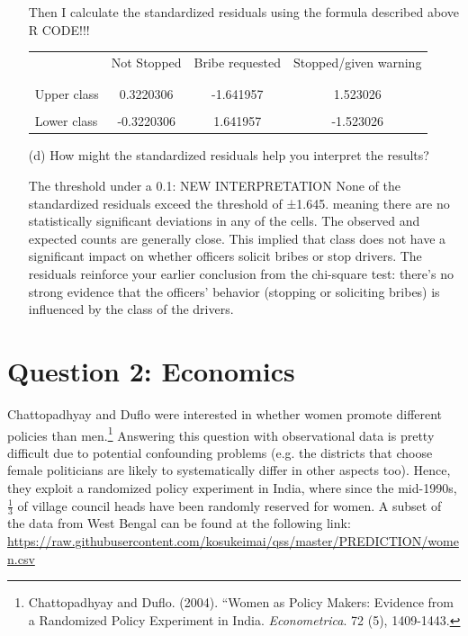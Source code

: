 \documentclass[12pt,letterpaper]{article}
\begin{document}
\begin{enumerate}
	Then I calculate the standardized residuals using the formula described above
	R CODE!!!
	
	\begin{table}[h]
		\centering
		\begin{tabular}{l | c c c }
			& Not Stopped & Bribe requested & Stopped/given warning \\
			\\[-1.8ex] 
			\hline \\[-1.8ex]
			Upper class  &0.3220306  & -1.641957 &1.523026  \\
			\\
			Lower class &-0.3220306  &1.641957   &-1.523026   \\
			
		\end{tabular}
	\end{table}
	
	
	\vspace{7cm}
	\item [(d)] How might the standardized residuals help you interpret the results?  
	
	The threshold under a 0.1: 
		NEW INTERPRETATION
		None of the standardized residuals exceed the threshold of ±1.645. meaning there are no statistically significant deviations in any of the cells. The observed and expected counts are generally close. This implied that class does not have a significant impact on whether officers solicit bribes or stop drivers.
	The residuals reinforce your earlier conclusion from the chi-square test: there's no strong evidence that the officers’ behavior (stopping or soliciting bribes) is influenced by the class of the drivers.
	
\end{enumerate}
\newpage

\section*{Question 2: Economics}
Chattopadhyay and Duflo were interested in whether women promote different policies than men.\footnote{Chattopadhyay and Duflo. (2004). ``Women as Policy Makers: Evidence from a Randomized Policy Experiment in India. \textit{Econometrica}. 72 (5), 1409-1443.} Answering this question with observational data is pretty difficult due to potential confounding problems (e.g. the districts that choose female politicians are likely to systematically differ in other aspects too). Hence, they exploit a randomized policy experiment in India, where since the mid-1990s, $\frac{1}{3}$ of village council heads have been randomly reserved for women. A subset of the data from West Bengal can be found at the following link: \url{https://raw.githubusercontent.com/kosukeimai/qss/master/PREDICTION/women.csv}\\
\end{document}
